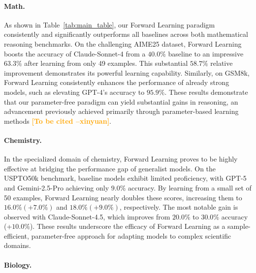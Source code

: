\documentclass{article}
\newcommand{\method}{Forward Learning}
\newcommand{\xinyuan}[1]{\textcolor{orange}{\bf \small [#1 --xinyuan]}}
\begin{document}
\paragraph{Math.} As shown in Table~\ref{tab:main_table}, our \method{} paradigm consistently and significantly outperforms all baselines across both mathematical reasoning benchmarks. On the challenging AIME25 dataset, \method{} boosts the accuracy of Claude-Sonnet-4 from a $40.0\%$ baseline to an impressive $63.3\%$ after learning from only 49 examples. This substantial $58.7\%$ relative improvement demonstrates its powerful learning capability. Similarly, on GSM8k, \method{} consistently enhances the performance of already strong models, such as elevating GPT-4's accuracy to $95.9\%$. These results demonstrate that our parameter-free paradigm can yield substantial gains in reasoning, an advancement previously achieved primarily through parameter-based learning methods \xinyuan{To be cited}.

\paragraph{Chemistry.} In the specialized domain of chemistry, \method{} proves to be highly effective at bridging the performance gap of generalist models. On the USPTO50k benchmark, baseline models exhibit limited proficiency, with GPT-5 and Gemini-2.5-Pro achieving only $9.0\%$ accuracy. By learning from a small set of 50 examples, \method{} nearly doubles these scores, increasing them to $16.0\% (+7.0\%)$ and $18.0\% (+9.0\%)$, respectively. The most notable gain is observed with Claude-Sonnet-4.5, which improves from $20.0\%$ to $30.0\%$ accuracy (+$10.0\%$). These results underscore the efficacy of \method{} as a sample-efficient, parameter-free approach for adapting models to complex scientific domains.


\paragraph{Biology.}
\end{document}
